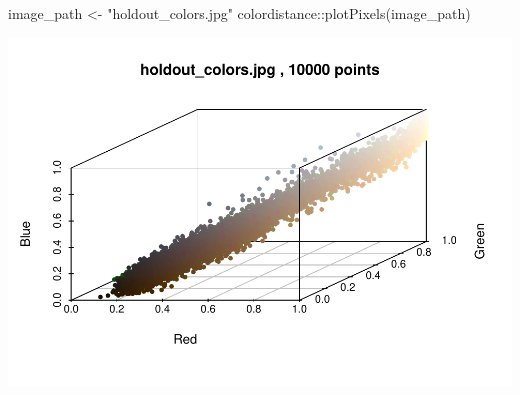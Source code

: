 \documentclass[
]{article}
\newenvironment{Shaded}{\begin{snugshade}}{\end{snugshade}}
\newcommand{\FunctionTok}[1]{\textcolor[rgb]{0.00,0.00,0.00}{#1}}
\newcommand{\NormalTok}[1]{#1}
\newcommand{\OtherTok}[1]{\textcolor[rgb]{0.56,0.35,0.01}{#1}}
\newcommand{\SpecialCharTok}[1]{\textcolor[rgb]{0.00,0.00,0.00}{#1}}
\newcommand{\StringTok}[1]{\textcolor[rgb]{0.31,0.60,0.02}{#1}}
\begin{document}
\begin{Shaded}
\begin{Highlighting}[]
\NormalTok{image\_path }\OtherTok{\textless{}{-}} \StringTok{"holdout\_colors.jpg"}
\NormalTok{colordistance}\SpecialCharTok{::}\FunctionTok{plotPixels}\NormalTok{(image\_path)}
\end{Highlighting}
\end{Shaded}

\begin{center}\includegraphics{ProjectPart1_MERGED_files/figure-latex/holdout color plot-1} \end{center}
\end{document}
